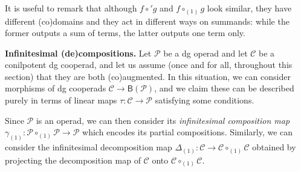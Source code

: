 \documentclass[fleqn, a4paper, twoside]{article}
\newcommand{\0}{\langle 0\rangle}
\newcommand{\B}[1]{\mathsf{B}(#1)}
\DeclareRobustCommand{\[}{\begin{equation}}%
\DeclareRobustCommand{\]}{\end{equation}}%
\theoremstyle{mytheorem}
\theoremstyle{introthm}
\theoremstyle{mydefinition}
\theoremstyle{mydefinition2}
\theoremstyle{plain} %
\newcommand{\CC}{\mathcal{C}}
\newcommand{\?}{\,?\,}
\newcommand{\PP}{{\mathcal{P}}}
\theoremstyle{mytheorem}
\theoremstyle{plain} %
\begin{document}
It is useful to remark that although $f\circ' g$ and $f\circ_{(1)} g$
look similar, they have different (co)domains and they act in different
ways on summands: while the former outputs a sum of terms, the latter
outputs one term only.

\medskip

\textbf{Infinitesimal (de)compositions.}
Let $\PP$ be a dg operad and let $\CC$ be a conilpotent
dg cooperad, and let us assume (once and for all, throughout
this section) that they are both (co)augmented. In this
situation, we can consider morphisms of dg cooperads
$\CC \longrightarrow \B{\PP}$, and we claim these
can be described purely in terms of linear maps
$\tau :\CC \longrightarrow \PP$ satisfying some conditions.

Since $\PP$ is an operad, we can then consider its 
\emph{infinitesimal composition map} $\gamma_{(1)} :\PP \circ_{(1)} 
	\PP\longrightarrow \PP$ which encodes its partial
	compositions. Similarly, we can consider the 
	infinitesimal decomposition map $\Delta_{(1)}:
\CC\longrightarrow  \CC\circ_{(1)} \CC$ obtained
by projecting the decomposition map of $\CC$ onto 
$\CC\circ_{(1)} \CC$.
\end{document}
